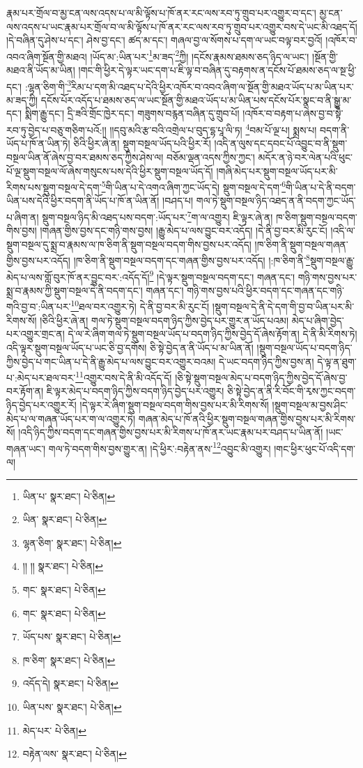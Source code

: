 རྣམ་པར་གྲོལ་བ་མྱ་ངན་ལས་འདས་པ་ལ་མི་ལྟོས་པ་ཁོ་ནར་རང་ལས་རབ་ཏུ་གྲུབ་པར་འགྱུར་བ་དང་། མྱ་ངན་ལས་འདས་པ་ཡང་རྣམ་པར་གྲོལ་བ་ལ་མི་ལྟོས་པ་ཁོ་ནར་རང་ལས་རབ་ཏུ་གྲུབ་པར་འགྱུར་བས་དེ་ཡང་མི་འཐད་དོ། །དེ་བཞིན་དུ་ཤེས་པ་དང་། ཤེས་བྱ་དང་། ཚད་མ་དང་། གཞལ་བྱ་ལ་སོགས་པ་དག་ལ་ཡང་བལྟ་བར་བྱའོ། །འཁོར་བ་འབའ་ཞིག་སྔོན་གྱི་མཐའ། །ཡོད་མ་:ཡིན་པར་\footnote{ཡིན་པ་  སྣར་ཐང་།  པེ་ཅིན། }མ་ཟད་\footnote{ཡིན་  སྣར་ཐང་།  པེ་ཅིན། }ཀྱི། །དངོས་རྣམས་ཐམས་ཅད་ཉིད་ལ་ཡང་། །སྔོན་གྱི་མཐའ་ནི་ཡོད་མ་ཡིན། །གང་གི་ཕྱིར་དེ་ལྟར་ཡང་དག་པ་ཇི་ལྟ་བ་བཞིན་དུ་བརྟགས་ན་དངོས་པོ་ཐམས་ཅད་ལ་སྔ་ཕྱི་དང་། :ལྷན་ཅིག་གི་\footnote{ལྷན་ཅིག་  སྣར་ཐང་།  པེ་ཅིན། }རིམ་པ་དག་མི་འཐད་པ་དེའི་ཕྱིར་འཁོར་བ་འབའ་ཞིག་ལ་སྔོན་གྱི་མཐའ་ཡོད་པ་མ་ཡིན་པར་མ་ཟད་ཀྱི། དངོས་པོར་འདོད་པ་ཐམས་ཅད་ལ་ཡང་སྔོན་གྱི་མཐའ་ཡོད་པ་མ་ཡིན་པས་དངོས་པོར་སྣང་བ་ནི་སྒྱུ་མ་དང་། སྨིག་རྒྱུ་དང་། དྲི་ཟའི་གྲོང་ཁྱེར་དང་། གཟུགས་བརྙན་བཞིན་དུ་གྲུབ་པོ། །འཁོར་བ་བརྟག་པ་ཞེས་བྱ་བ་སྟེ་རབ་ཏུ་བྱེད་པ་བཅུ་གཅིག་པའོ:།། །།དབུ་མའི་རྩ་བའི་འགྲེལ་པ་བུད་དྷ་པཱ་ལི་ཏ། \footnote{།། །།   སྣར་ཐང་།  པེ་ཅིན། }བམ་པོ་ལྔ་པ། སྨྲས་པ། བདག་ནི་ཡོད་པ་ཁོ་ན་ཡིན་ཏེ། ཅིའི་ཕྱིར་ཞེ་ན། སྡུག་བསྔལ་ཡོད་པའི་ཕྱིར་རོ། །འདི་ན་ལུས་དང་དབང་པོ་འབྱུང་བ་ནི་སྡུག་བསྔལ་ཡིན་ནོ་ཞེས་བྱ་བར་ཐམས་ཅད་ཀྱིས་ཤེས་ལ། བཅོམ་ལྡན་འདས་ཀྱིས་ཀྱང་། མདོར་ན་ཉེ་བར་ལེན་པའི་ཕུང་པོ་ལྔ་སྡུག་བསྔལ་ལོ་ཞེས་གསུངས་པས་དེའི་ཕྱིར་སྡུག་བསྔལ་ཡོད་དོ། །གཞི་མེད་པར་སྡུག་བསྔལ་ཡོད་པར་མི་རིགས་པས་སྡུག་བསྔལ་དེ་དག་\footnote{གང་  སྣར་ཐང་།  པེ་ཅིན། }གི་ཡིན་པ་དེ་འགའ་ཞིག་ཀྱང་ཡོད་དེ། སྡུག་བསྔལ་དེ་དག་\footnote{གང་  སྣར་ཐང་།  པེ་ཅིན། }གི་ཡིན་པ་དེ་ནི་བདག་ཡིན་པས་དེའི་ཕྱིར་བདག་ནི་ཡོད་པ་ཁོ་ན་ཡིན་ནོ། །བཤད་པ། གལ་ཏེ་སྡུག་བསྔལ་ཉིད་འཐད་ན་ནི་བདག་ཀྱང་ཡོད་པ་ཞིག་ན། སྡུག་བསྔལ་ཉིད་མི་འཐད་པས་བདག་:ཡོད་པར་\footnote{ཡོད་པས་  སྣར་ཐང་།  པེ་ཅིན། }ག་ལ་འགྱུར། ཇི་ལྟར་ཞེ་ན། ཁ་ཅིག་སྡུག་བསྔལ་བདག་གིས་བྱས། །གཞན་གྱིས་བྱས་དང་གཉི་གས་བྱས། །རྒྱུ་མེད་པ་ལས་བྱུང་བར་འདོད། །དེ་ནི་བྱ་བར་མི་རུང་ངོ། །འདི་ལ་སྡུག་བསྔལ་དུ་སྨྲ་བ་རྣམས་ལ་ཁ་ཅིག་ནི་སྡུག་བསྔལ་བདག་གིས་བྱས་པར་འདོད། །ཁ་ཅིག་ནི་སྡུག་བསྔལ་གཞན་གྱིས་བྱས་པར་འདོད། །ཁ་ཅིག་ནི་སྡུག་བསྔལ་བདག་དང་གཞན་གྱིས་བྱས་པར་འདོད། །:ཁ་ཅིག་ནི་\footnote{ཁ་ཅིག་  སྣར་ཐང་།  པེ་ཅིན། }སྡུག་བསྔལ་རྒྱུ་མེད་པ་ལས་གློ་བུར་ཁོ་ནར་བྱུང་བར་:འདོད་དོ།\footnote{འདོད་དེ།  སྣར་ཐང་།  པེ་ཅིན། } །དེ་ལྟར་སྡུག་བསྔལ་བདག་དང་། གཞན་དང་། གཉི་གས་བྱས་པར་སྨྲ་བ་རྣམས་ཀྱི་སྡུག་བསྔལ་དེ་ནི་བདག་དང་། གཞན་དང་། གཉི་གས་བྱས་པའི་ཕྱིར་བདག་དང་གཞན་དང་གཉི་གའི་བྱ་བ་:ཡིན་པར་\footnote{ཡིན་པས་  སྣར་ཐང་།  པེ་ཅིན། }ཐལ་བར་འགྱུར་ཏེ། དེ་ནི་བྱ་བར་མི་རུང་ངོ། །སྡུག་བསྔལ་དེ་ནི་དེ་དག་གི་བྱ་བ་ཡིན་པར་མི་རིགས་སོ། །ཅིའི་ཕྱིར་ཞེ་ན། གལ་ཏེ་སྡུག་བསྔལ་བདག་ཉིད་ཀྱིས་བྱེད་པར་གྱུར་ན་ཡོད་པའམ། མེད་པ་ཞིག་བྱེད་པར་འགྱུར་གྲང་ན། དེ་ལ་རེ་ཞིག་གལ་ཏེ་སྡུག་བསྔལ་ཡོད་པ་བདག་ཉིད་ཀྱིས་བྱེད་དོ་ཞེས་རྟོག་ན། དེ་ནི་མི་རིགས་ཏེ། འདི་ལྟར་སྡུག་བསྔལ་ཡོད་པ་ཡང་ཅི་བྱ་དགོས། ཅི་སྟེ་བྱེད་ན་ནི་ཡོད་པ་མ་ཡིན་ནོ། །སྡུག་བསྔལ་ཡོད་པ་བདག་ཉིད་ཀྱིས་བྱེད་པ་གང་ཡིན་པ་དེ་ནི་རྒྱུ་མེད་པ་ལས་བྱུང་བར་འགྱུར་བའམ། དེ་ཡང་བདག་ཉིད་ཀྱིས་བྱས་ན། དེ་ལྟ་ན་ཐུག་པ་:མེད་པར་ཐལ་བར་\footnote{མེད་པར་  པེ་ཅིན། }འགྱུར་བས་དེ་ནི་མི་འདོད་དོ། །ཅི་སྟེ་སྡུག་བསྔལ་མེད་པ་བདག་ཉིད་ཀྱིས་བྱེད་དོ་ཞེས་བྱ་བར་རྟོག་ན། ཇི་ལྟར་མེད་པ་བདག་ཉིད་ཀྱིས་བདག་ཉིད་བྱེད་པར་འགྱུར། ཅི་སྟེ་བྱེད་ན་ནི་རི་བོང་གི་རྭས་ཀྱང་བདག་ཉིད་བྱེད་པར་འགྱུར་རོ། །དེ་ལྟར་རེ་ཞིག་སྡུག་བསྔལ་བདག་གིས་བྱས་པར་མི་རིགས་སོ། །སྡུག་བསྔལ་མ་བྱས་ཤིང་མེད་པ་ལ་གཞན་ཡོད་པར་ག་ལ་འགྱུར་ཏེ། གཞན་མེད་པ་ཁོ་ནའི་ཕྱིར་སྡུག་བསྔལ་གཞན་གྱིས་བྱས་པར་མི་རིགས་སོ། །འདི་ཉིད་ཀྱིས་བདག་དང་གཞན་གྱིས་བྱས་པར་མི་རིགས་པ་ཁོ་ནར་ཡང་རྣམ་པར་བཤད་པ་ཡིན་ནོ། །ཡང་གཞན་ཡང་། གལ་ཏེ་བདག་གིས་བྱས་གྱུར་ན། །དེ་ཕྱིར་:བརྟེན་ནས་\footnote{བརྟེན་ལས་  སྣར་ཐང་།  པེ་ཅིན། }འབྱུང་མི་འགྱུར། །གང་ཕྱིར་ཕུང་པོ་འདི་དག་ལ། 